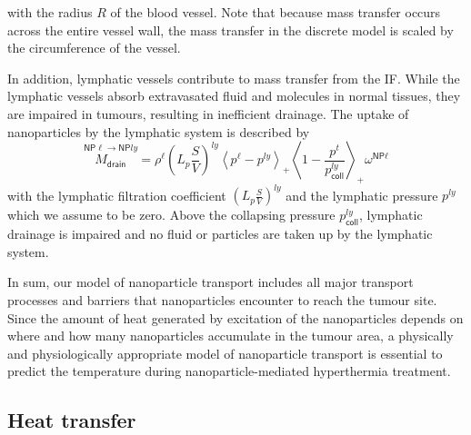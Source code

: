 \documentclass[Times1COL,AMA]{WileyNJDv5} %
\newcommand{\NP}{{\textsf{NP}}}
\newcommand{\omegaNPl}{\omega^{\textsf{NP}\ell}}
\begin{document}
with the radius $R$ of the blood vessel.
Note that because mass transfer occurs across the entire vessel wall, the mass transfer in the discrete model is scaled by the circumference of the vessel.

In addition, lymphatic vessels contribute to mass transfer from the IF.
While the lymphatic vessels absorb extravasated fluid and molecules in normal tissues, they are impaired in tumours, resulting in inefficient drainage. \cite{Carmeliet2000,Jain2002}
The uptake of nanoparticles by the lymphatic system is described by
\begin{equation}
    \overset{\NP\ell \rightarrow \NP{ly}}{M_{\textsf{drain}}}
    =
    \rho^\ell \left(L_p \frac{S}{V}\right)^{ly} \left\langle p^\ell - p^{ly} \right\rangle _+ \left\langle 1 - \frac{p^t}{p^{ly}_{\textsf{coll}}} \right\rangle _+ \omegaNPl
\end{equation}
with the lymphatic filtration coefficient $\left(L_p \frac{S}{V}\right)^{ly}$ and the lymphatic pressure $p^{ly}$ which we assume to be zero.
Above the collapsing pressure $p^{ly}_{\textsf{coll}}$, lymphatic drainage is impaired and no fluid or particles are taken up by the lymphatic system.

In sum, our model of nanoparticle transport includes all major transport processes and barriers that nanoparticles encounter to reach the tumour site.
Since the amount of heat generated by excitation of the nanoparticles depends on where and how many nanoparticles accumulate in the tumour area, a physically and physiologically appropriate model of nanoparticle transport is essential to predict the temperature during nanoparticle-mediated hyperthermia treatment.

\subsection{Heat transfer}\label{sec:HeatEquation}
\end{document}
